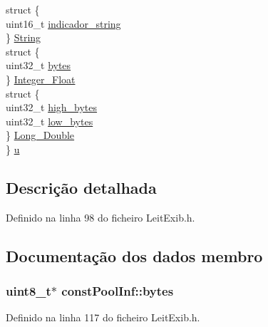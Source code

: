 \begin{DoxyCompactItemize}
\begin{tabbing}
\>struct \{\\
\>\>uint16\_t \hyperlink{structconst_pool_inf_a0d09a4566d526db83cd87836f18df28c}{indicador\_string}\\
\>\} \hyperlink{structconst_pool_inf_adfd1e8831065142d9deb97e7bd79c356}{String}\\
\>struct \{\\
\>\>uint32\_t \hyperlink{structconst_pool_inf_a6e7de138b8c2f5514813538787f73c16}{bytes}\\
\>\} \hyperlink{structconst_pool_inf_a9cc60d2e41859cb617704d61374ddb74}{Integer\_Float}\\
\>struct \{\\
\>\>uint32\_t \hyperlink{structconst_pool_inf_ab116ef79f6cae5784e038805c26f2d20}{high\_bytes}\\
\>\>uint32\_t \hyperlink{structconst_pool_inf_a15471799757777098756cc8ec1cd9a3c}{low\_bytes}\\
\>\} \hyperlink{structconst_pool_inf_a25e99a2c4f18168165ed83b5f4cfe234}{Long\_Double}\\
\} \hyperlink{structconst_pool_inf_ad39a609c73e52b6faa7d2f1a29a14d28}{u}\\

\end{tabbing}\end{DoxyCompactItemize}


\subsection{Descrição detalhada}


Definido na linha 98 do ficheiro Leit\-Exib.\-h.



\subsection{Documentação dos dados membro}
\hypertarget{structconst_pool_inf_ad855f3fa643b42a9f2506f06d2f74310}{
\subsubsection[{bytes}]{\setlength{\rightskip}{0pt plus 5cm}uint8\-\_\-t$\ast$ const\-Pool\-Inf\-::bytes}}\label{structconst_pool_inf_ad855f3fa643b42a9f2506f06d2f74310}


Definido na linha 117 do ficheiro Leit\-Exib.\-h.

